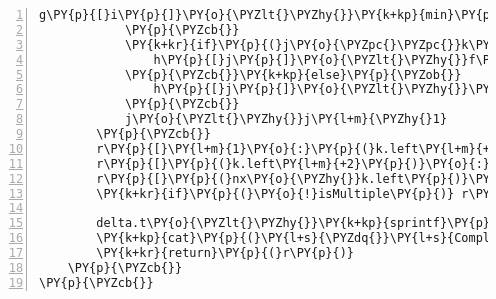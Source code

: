 \begin{Verbatim}[commandchars=\\\{\},codes={\catcode`\$=3\catcode`\^=7\catcode`\_=8},gobble=0,numbers=left,fontfamily=fvm,fontshape=n,fontsize=\footnotesize,tabsize=2]
				g\PY{p}{[}i\PY{p}{]}\PY{o}{\PYZlt{}\PYZhy{}}\PY{k+kp}{min}\PY{p}{(}g\PY{p}{[}i\PY{l+m}{\PYZhy{}1}\PY{p}{]}\PY{p}{,}f\PY{p}{[}i\PY{p}{]}\PY{p}{)}
			\PY{p}{\PYZcb{}}
			\PY{k+kr}{if}\PY{p}{(}j\PY{o}{\PYZpc{}\PYZpc{}}k\PY{o}{==}\PY{l+m}{0}\PY{p}{)}\PY{p}{\PYZob{}}
				h\PY{p}{[}j\PY{p}{]}\PY{o}{\PYZlt{}\PYZhy{}}f\PY{p}{[}j\PY{p}{]}
			\PY{p}{\PYZcb{}}\PY{k+kp}{else}\PY{p}{\PYZob{}}
				h\PY{p}{[}j\PY{p}{]}\PY{o}{\PYZlt{}\PYZhy{}}\PY{k+kp}{min}\PY{p}{(}h\PY{p}{[}j\PY{l+m}{+1}\PY{p}{]}\PY{p}{,}f\PY{p}{[}j\PY{p}{]}\PY{p}{)}
			\PY{p}{\PYZcb{}}
			j\PY{o}{\PYZlt{}\PYZhy{}}j\PY{l+m}{\PYZhy{}1}
		\PY{p}{\PYZcb{}}
		r\PY{p}{[}\PY{l+m}{1}\PY{o}{:}\PY{p}{(}k.left\PY{l+m}{+1}\PY{p}{)}\PY{p}{]}\PY{o}{\PYZlt{}\PYZhy{}}g\PY{p}{[}\PY{p}{(}k.left\PY{l+m}{+1}\PY{p}{)}\PY{o}{:}k\PY{p}{]}
		r\PY{p}{[}\PY{p}{(}k.left\PY{l+m}{+2}\PY{p}{)}\PY{o}{:}\PY{p}{(}nx\PY{o}{\PYZhy{}}k.left\PY{l+m}{\PYZhy{}1}\PY{p}{)}\PY{p}{]}\PY{o}{\PYZlt{}\PYZhy{}}\PY{k+kp}{pmin}\PY{p}{(}g\PY{p}{[}\PY{p}{(}k\PY{l+m}{+1}\PY{p}{)}\PY{o}{:}\PY{p}{(}nx\PY{l+m}{\PYZhy{}1}\PY{p}{)}\PY{p}{]}\PY{p}{,}h\PY{p}{[}\PY{l+m}{2}\PY{o}{:}\PY{p}{(}nx\PY{o}{\PYZhy{}}k\PY{p}{)}\PY{p}{]}\PY{p}{)}
		r\PY{p}{[}\PY{p}{(}nx\PY{o}{\PYZhy{}}k.left\PY{p}{)}\PY{o}{:}nx\PY{p}{]}\PY{o}{\PYZlt{}\PYZhy{}}h\PY{p}{[}\PY{p}{(}nx\PY{o}{\PYZhy{}}k\PY{l+m}{+1}\PY{p}{)}\PY{o}{:}\PY{p}{(}nx\PY{o}{\PYZhy{}}k.left\PY{p}{)}\PY{p}{]}
		\PY{k+kr}{if}\PY{p}{(}\PY{o}{!}isMultiple\PY{p}{)} r\PY{o}{\PYZlt{}\PYZhy{}}r\PY{p}{[}\PY{o}{\PYZhy{}}rem.indxs\PY{p}{]}
		
		delta.t\PY{o}{\PYZlt{}\PYZhy{}}\PY{k+kp}{sprintf}\PY{p}{(}\PY{l+s}{\PYZdq{}}\PY{l+s}{\PYZpc{}.2f\PYZdq{}}\PY{p}{,}\PY{k+kp}{proc.time}\PY{p}{(}\PY{p}{)}\PY{p}{[}\PY{l+m}{3}\PY{p}{]}\PY{o}{\PYZhy{}}t1\PY{p}{)} \PY{c+c1}{\PYZsh{}\PYZsh{}\PYZsh{} time elapsed}
		\PY{k+kp}{cat}\PY{p}{(}\PY{l+s}{\PYZdq{}}\PY{l+s}{Completed morphological erosion in\PYZdq{}}\PY{p}{,}delta.t\PY{p}{,}\PY{l+s}{\PYZdq{}}\PY{l+s}{seconds\PYZbs{}n\PYZdq{}}\PY{p}{)}
		\PY{k+kr}{return}\PY{p}{(}r\PY{p}{)}
	\PY{p}{\PYZcb{}}
\PY{p}{\PYZcb{}}
\end{Verbatim}
